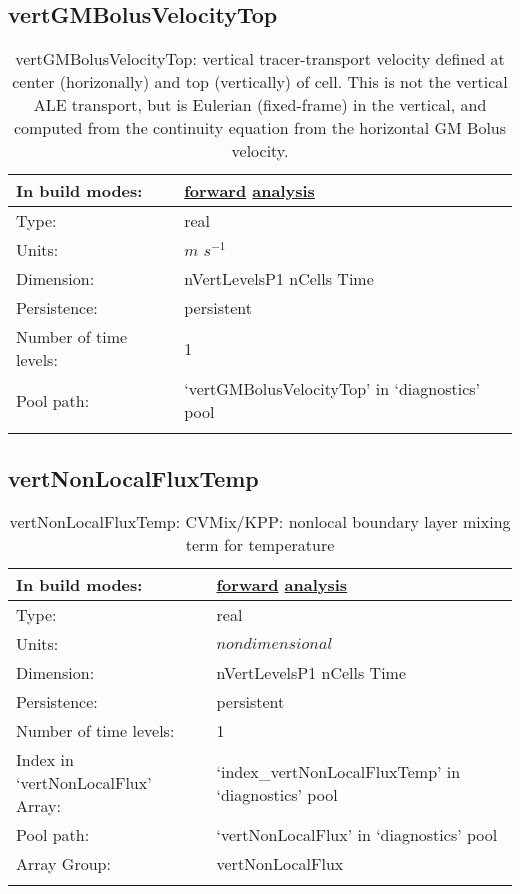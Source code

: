 \subsection[vertGMBolusVelocityTop]{vertGMBolusVelocityTop}
\label{subsec:var_sec_diagnostics_vertGMBolusVelocityTop}
\begin{center}
\begin{longtable}{| p{2.0in} | p{4.0in} |}
        \hline 
        In build modes: & \hyperref[subsec:forward_var_tab_diagnostics]{forward} \hyperref[subsec:analysis_var_tab_diagnostics]{analysis} \\
        \hline 
        Type: & real \\
        \hline 
        Units: & $m$ $s^{-1}$ \\
        \hline 
        Dimension: & nVertLevelsP1 nCells Time \\
        \hline 
        Persistence: & persistent \\
        \hline 
        Number of time levels: & 1 \\
        \hline 
            Pool path: & `vertGMBolusVelocityTop' in `diagnostics' pool \\
		 \hline 
    \caption{vertGMBolusVelocityTop: vertical tracer-transport velocity defined at center (horizonally) and top (vertically) of cell.  This is not the vertical ALE transport, but is Eulerian (fixed-frame) in the vertical, and computed from the continuity equation from the horizontal GM Bolus velocity.}
\end{longtable}
\end{center}
\subsection[vertNonLocalFluxTemp]{vertNonLocalFluxTemp}
\label{subsec:var_sec_diagnostics_vertNonLocalFluxTemp}
\begin{center}
\begin{longtable}{| p{2.0in} | p{4.0in} |}
        \hline 
        In build modes: & \hyperref[subsec:forward_var_tab_diagnostics]{forward} \hyperref[subsec:analysis_var_tab_diagnostics]{analysis} \\
        \hline 
        Type: & real \\
        \hline 
        Units: & $nondimensional$ \\
        \hline 
        Dimension: & nVertLevelsP1 nCells Time \\
        \hline 
        Persistence: & persistent \\
        \hline 
        Number of time levels: & 1 \\
        \hline 
		 Index in `vertNonLocalFlux' Array: & `index\_vertNonLocalFluxTemp' in `diagnostics' pool \\
		 \hline 
            Pool path: & `vertNonLocalFlux' in `diagnostics' pool \\
		 \hline 
		 Array Group: & vertNonLocalFlux \\
		 \hline 
    \caption{vertNonLocalFluxTemp: CVMix/KPP: nonlocal boundary layer mixing term for temperature}
\end{longtable}
\end{center}
